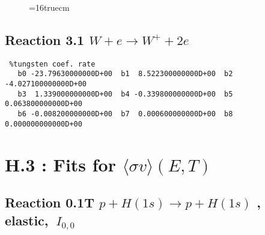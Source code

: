 \documentclass[12pt,dvipdfmx]{article}
\begin{document}
\begin{figure} \label{2.26B}
\epsfxsize=16truecm
\end{figure}

\subsection{
Reaction 3.1 $W + e \rightarrow W^+ + 2e $ }

\begin{small}\begin{verbatim} %tungsten coef. rate
   b0 -23.79630000000D+00  b1  8.522300000000D+00  b2 -4.027100000000D+00
   b3  1.339000000000D+00  b4 -0.339800000000D+00  b5  0.063800000000D+00
   b6 -0.008200000000D+00  b7  0.000600000000D+00  b8  0.000000000000D+00
\end{verbatim}\end{small}

\newpage

\section{H.3 : Fits for $\langle\sigma v \rangle (E,T)$}\label{sect3}


\subsection{
Reaction 0.1T  $p + H(1s) \rightarrow  p + H(1s)$
, elastic,
$\  I_{0,0}$
}
\end{document}
